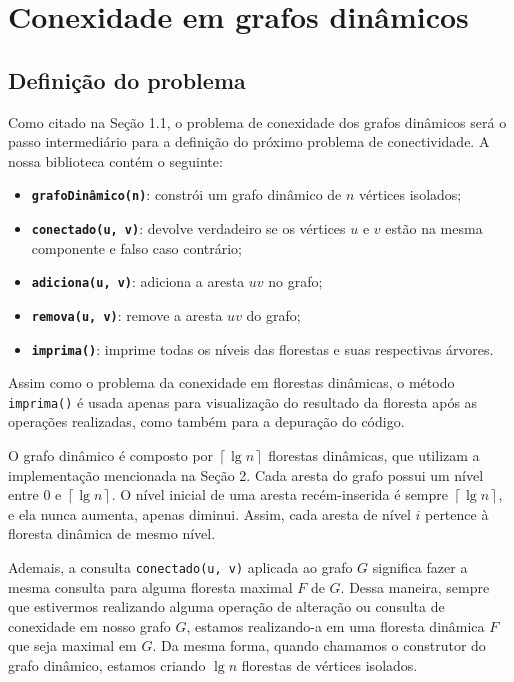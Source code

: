 
\chapter{Conexidade em grafos dinâmicos}

\enlargethispage{.8\baselineskip}

\section{Definição do problema}

Como citado na Seção 1.1, o problema de conexidade dos grafos dinâmicos será o passo intermediário para a definição do próximo problema de conectividade. A nossa biblioteca contém o seguinte:

\begin{itemize}
    \item \texttt{\textbf{grafoDinâmico(n)}}: constrói um grafo dinâmico de $n$ vértices isolados;
    \item \texttt{\textbf{conectado(u, v)}}: devolve verdadeiro se os vértices $u$ e $v$ estão na mesma componente e falso caso contrário;
    \item \texttt{\textbf{adiciona(u, v)}}: adiciona a aresta $uv$ no grafo;
    \item \texttt{\textbf{remova(u, v)}}: remove a aresta $uv$ do grafo;
    \item \texttt{\textbf{imprima()}}: imprime todas os níveis das florestas e suas respectivas árvores.
\end{itemize}

Assim como o problema da conexidade em florestas dinâmicas, o método \texttt{imprima()} é usada apenas para visualização do resultado da floresta após as operações realizadas, como também para a depuração do código. 

O grafo dinâmico é composto por $\left\lceil \lg n \right\rceil$ florestas dinâmicas, que utilizam a implementação mencionada na Seção 2. Cada aresta do grafo possui um nível entre $0$ e $\left\lceil \lg n \right\rceil$. O nível inicial de uma aresta recém-inserida é sempre $\left\lceil \lg n \right\rceil$, e ela nunca aumenta, apenas diminui. Assim, cada aresta de nível $i$ pertence à floresta dinâmica de mesmo nível. 

Ademais, a consulta \texttt{conectado(u, v)} aplicada ao grafo $G$ significa fazer a mesma consulta para alguma floresta maximal $F$ de $G$. Dessa maneira, sempre que estivermos realizando alguma operação de alteração ou consulta de conexidade em nosso grafo $G$, estamos realizando-a em uma floresta dinâmica $F$ que seja maximal em $G$. Da mesma forma, quando chamamos o construtor do grafo dinâmico, estamos criando $\lg n$ florestas de vértices isolados.